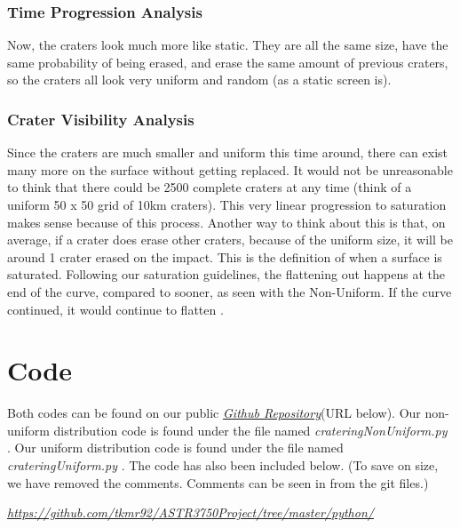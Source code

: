 \documentclass[11pt]{article}
\begin{document}
\subsubsection{Time Progression Analysis}
Now, the craters look much more like static. They are all the same size, have the same probability of being erased, and erase the same amount of previous craters, so the craters all look very uniform and random (as a static screen is). 
 
\subsubsection{Crater Visibility Analysis}
Since the craters are much smaller and uniform this time around, there can exist many more on the surface without getting replaced. It would not be unreasonable to think that there could be 2500 complete craters at any time (think of a uniform 50 x 50 grid of 10km craters). This very linear progression to saturation makes sense because of this process. Another way to think about this is that, on average, if a crater does erase other craters, because of the uniform size, it will be around 1 crater erased on the impact. This is the definition of when a surface is saturated. Following our saturation guidelines, the flattening out happens at the end of the curve, compared to sooner, as seen with the Non-Uniform. If the curve continued, it would continue to flatten .

\section{Code}
Both codes can be found on our public \href{https://github.com/tkmr92/ASTR3750Project/tree/master/python}{\underline {\textit {Github Repository}}}(URL below). Our non-uniform distribution code is found under the file named \textit{crateringNonUniform.py} . Our uniform distribution code is found under the file named \textit{crateringUniform.py} . The code has also been included below. (To save on size, we have removed the comments. Comments can be seen in from the git files.)\\
\begin{center}
\underline{\textit{https://github.com/tkmr92/ASTR3750Project/tree/master/python/}}
\end{center}
\end{document}
